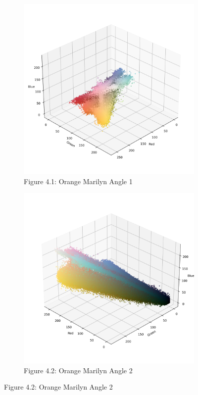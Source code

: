 \documentclass{article}
\begin{document}
\begin{figure}[ht]
  \centering
  \begin{subfigure}{0.45\textwidth}
    \centering
    \includegraphics[width=\textwidth]{main_files/figure-latex/4_1_orange_marilyn_original_scatter.jpg}
    \caption{Figure 4.1: Orange Marilyn Angle 1}
    \label{fig:4_1_orange_marilyn_original_scatter}
  \end{subfigure}
  \hfill
  \begin{subfigure}{0.45\textwidth}
    \centering
    \includegraphics[width=\textwidth]{main_files/figure-latex/4_2_orange_marilyn_original_scatter.jpg}
    \caption{Figure 4.2: Orange Marilyn Angle 2}
    \label{fig:4_2_orange_marilyn_original_scatter}
  \end{subfigure}
  

\end{figure}
\end{document}
